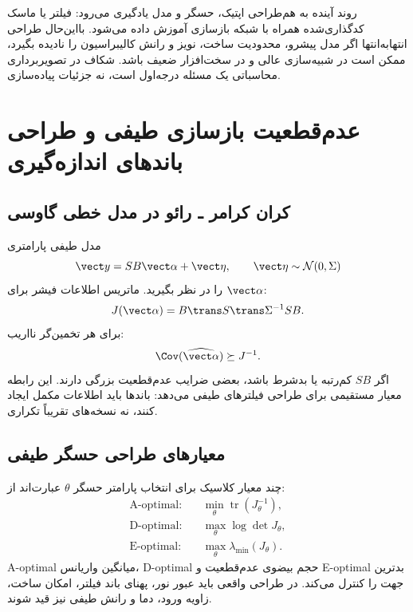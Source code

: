 \begin{futurebox}
روند آینده به هم‌طراحی اپتیک، حسگر و مدل یادگیری می‌رود: فیلتر یا ماسک کدگذاری‌شده همراه با شبکه
بازسازی آموزش داده می‌شود. بااین‌حال طراحی انتهابه‌انتها اگر مدل پیشرو، محدودیت ساخت، نویز و رانش
کالیبراسیون را نادیده بگیرد، ممکن است در شبیه‌سازی عالی و در سخت‌افزار ضعیف باشد. شکاف
 در تصویربرداری محاسباتی یک مسئله درجه‌اول است، نه جزئیات پیاده‌سازی.
\end{futurebox}


\section{عدم‌قطعیت بازسازی طیفی و طراحی باندهای اندازه‌گیری}

\subsection{کران کرامر ـ رائو در مدل خطی گاوسی}

مدل طیفی پارامتری
\begin{equation}
\vect y=S B\vect\alpha+\vect\eta,
\qquad \vect\eta\sim\mathcal N(0,\Sigma)
\end{equation}
را در نظر بگیرید. ماتریس اطلاعات فیشر برای \(\vect\alpha\):
\begin{equation}
J(\vect\alpha)=B\trans S\trans\Sigma^{-1}SB.
\end{equation}
برای هر تخمین‌گر نااریب:
\begin{equation}
\Cov(\widehat{\vect\alpha})\succeq J^{-1}.
\label{eq:spectral-crlb}
\end{equation}
اگر \(SB\) کم‌رتبه یا بدشرط باشد، بعضی ضرایب عدم‌قطعیت بزرگی دارند. این رابطه معیار مستقیمی برای
طراحی فیلترهای طیفی می‌دهد: باندها باید اطلاعات مکمل ایجاد کنند، نه نسخه‌های تقریباً تکراری.

\subsection{معیارهای طراحی حسگر طیفی}

چند معیار کلاسیک برای انتخاب پارامتر حسگر \(\theta\) عبارت‌اند از:
\begin{align}
\text{A-optimal:}&\quad \min_\theta\operatorname{tr}(J_\theta^{-1}),\\
\text{D-optimal:}&\quad \max_\theta\log\det J_\theta,\\
\text{E-optimal:}&\quad \max_\theta\lambda_{\min}(J_\theta).
\end{align}
A-optimal میانگین واریانس، D-optimal حجم بیضوی عدم‌قطعیت و E-optimal بدترین جهت را کنترل می‌کند.
در طراحی واقعی باید عبور نور، پهنای باند فیلتر، امکان ساخت، زاویه ورود، دما و رانش طیفی نیز قید شوند.

